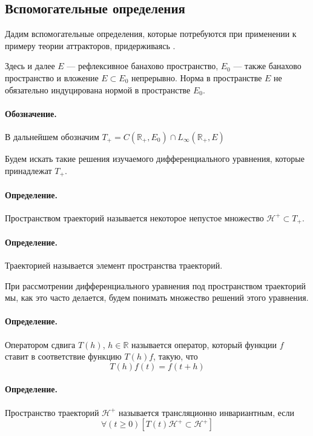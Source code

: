 \subsection{Вспомогательные определения}

Дадим вспомогательные определения, которые потребуются при применении к примеру теории аттракторов,
придерживаясь \cite[\S 3.2]{Zelenaya}.

Здесь и далее $E$ --- рефлексивное банахово пространство,
$E_0$ --- также банахово пространство и вложение $E \subset E_0$ непрерывно.
Норма в пространстве $E$ не обязательно индуцирована нормой в пространстве $E_0$.

\paragraph{Обозначение.}
В дальнейшем обозначим $T_+ = C(\mathbb{R}_+,E_0) \cap L_\infty(\mathbb{R}_+,E)$

Будем искать такие решения изучаемого дифференциального уравнения,
которые принадлежат $T_+$.


\paragraph{Определение.}
Пространством траекторий называется некоторое непустое множество $\mathcal{H}^+ \subset T_+$.

\paragraph{Определение.}
Траекторией называется элемент пространства траекторий.

При рассмотрении дифференциального уравнения под пространством траекторий мы, как это часто делается,
будем понимать множество решений этого уравнения.


\paragraph{Определение.}
Оператором сдвига $T(h)$, $h\in\mathbb{R}$ называется оператор, который функции $f$ ставит в соответствие функцию $T(h)f$, такую, что
$$
T(h)f(t)=f(t+h)
$$


\paragraph{Определение.}
Пространство траекторий $\mathcal{H}^+$ называется трансляционно инвариантным, если
$$
\forall(t \geq 0)\left[T(t)\mathcal{H}^+ \subset \mathcal{H}^+ \right]
$$

